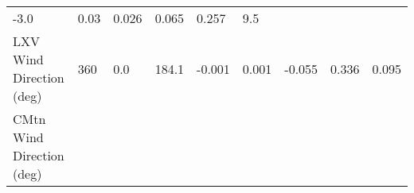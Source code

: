 \documentclass[11pt]{article}
\begin{document}
\begin{longtable}[]{@{}lllllllll@{}}
\begin{minipage}[t]{0.08\columnwidth}
-3.0\strut
\end{minipage} & \begin{minipage}[t]{0.05\columnwidth}\raggedright\strut
0.03\strut
\end{minipage} & \begin{minipage}[t]{0.07\columnwidth}\raggedright\strut
0.026\strut
\end{minipage} & \begin{minipage}[t]{0.06\columnwidth}\raggedright\strut
0.065\strut
\end{minipage} & \begin{minipage}[t]{0.06\columnwidth}\raggedright\strut
0.257\strut
\end{minipage} & \begin{minipage}[t]{0.07\columnwidth}\raggedright\strut
9.5\strut
\end{minipage}\tabularnewline
\begin{minipage}[t]{0.25\columnwidth}\raggedright\strut
LXV Wind Direction (deg)\strut
\end{minipage} & \begin{minipage}[t]{0.06\columnwidth}\raggedright\strut
360\strut
\end{minipage} & \begin{minipage}[t]{0.06\columnwidth}\raggedright\strut
0.0\strut
\end{minipage} & \begin{minipage}[t]{0.08\columnwidth}\raggedright\strut
184.1\strut
\end{minipage} & \begin{minipage}[t]{0.05\columnwidth}\raggedright\strut
-0.001\strut
\end{minipage} & \begin{minipage}[t]{0.07\columnwidth}\raggedright\strut
0.001\strut
\end{minipage} & \begin{minipage}[t]{0.06\columnwidth}\raggedright\strut
-0.055\strut
\end{minipage} & \begin{minipage}[t]{0.06\columnwidth}\raggedright\strut
0.336\strut
\end{minipage} & \begin{minipage}[t]{0.07\columnwidth}\raggedright\strut
0.095\strut
\end{minipage}\tabularnewline
\begin{minipage}[t]{0.25\columnwidth}\raggedright\strut
CMtn Wind Direction (deg)\strut
\end{minipage} & \begin{minipage}[t]{0.06\columnwidth}\raggedright\strut

\end{minipage}
\end{longtable}
\end{document}
